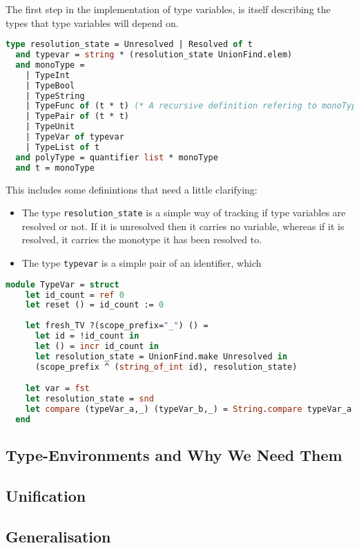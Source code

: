 \documentclass{l4proj}
\begin{document}
The first step in the implementation of type variables, is itself describing the types that type variables will depend on.

\begin{lstlisting}[language=Caml]
  type resolution_state = Unresolved | Resolved of t
  and typevar = string * (resolution_state UnionFind.elem)
  and monoType = 
    | TypeInt
    | TypeBool
    | TypeString
    | TypeFunc of (t * t) (* A recursive definition refering to monoType. *)
    | TypePair of (t * t)
    | TypeUnit
    | TypeVar of typevar
    | TypeList of t
  and polyType = quantifier list * monoType
  and t = monoType
\end{lstlisting}

This includes some definintions that need a little clarifying:
\begin{itemize}
    \item The type \texttt{resolution\_state} is a simple way of tracking if type variables are resolved or not.
    If it is unresolved then it carries no variable, whereas if it is resolved, it carries the monotype it has been resolved to.
    \item The type \texttt{typevar} is a simple pair of an identifier, which
\end{itemize}

\begin{lstlisting}[language=Caml, caption=The TypeVar module. The module specifies the utility functions for the management of type variables.]
  module TypeVar = struct
    let id_count = ref 0
    let reset () = id_count := 0
    
    let fresh_TV ?(scope_prefix="_") () =
      let id = !id_count in
      let () = incr id_count in
      let resolution_state = UnionFind.make Unresolved in
      (scope_prefix ^ (string_of_int id), resolution_state)

    let var = fst
    let resolution_state = snd
    let compare (typeVar_a,_) (typeVar_b,_) = String.compare typeVar_a typeVar_b
  end
\end{lstlisting}

\subsection{Type-Environments and Why We Need Them}
\subsection{Unification}
\subsection{Generalisation}
\end{document}
